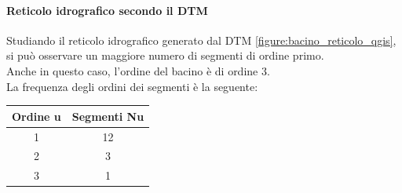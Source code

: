\paragraph{Reticolo idrografico secondo il DTM}
Studiando il reticolo idrografico generato dal DTM \eqref{figure:bacino_reticolo_qgis}, si può osservare un maggiore numero di segmenti di ordine primo.\\
Anche in questo caso, l'ordine del bacino è di ordine 3.\\
La frequenza degli ordini dei segmenti è la seguente:
\begin{table}[H] \centering
    \begin{tabular}{cc}
\toprule
    Ordine u & Segmenti Nu \\
\midrule    
    1        & 12          \\
    2        & 3          \\
    3        & 1           \\
\bottomrule    
\end{tabular}
\end{table}

